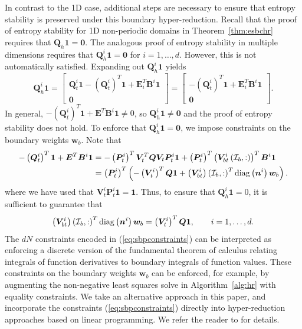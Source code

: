 \documentclass[review]{siamart171218}
\theoremstyle{assumption}
\newcommand{\LRp}[1]{\left( #1 \right)}
\newcommand{\note}[1]{{\color{blue}{#1}}}
\begin{document}
In contrast to the 1D case, additional steps are necessary to ensure that entropy stability is preserved under this boundary hyper-reduction.  Recall that the proof of entropy stability for 1D non-periodic domains in Theorem~\ref{thm:esbchr} requires that $\bm{Q}_h\bm{1} = \bm{0}$.  The analogous proof of entropy stability in multiple dimensions requires that $\bm{Q}^i_h\bm{1} = \bm{0}$ for $i = 1,\ldots, d$.  However, this is not automatically satisfied.  Expanding out $\bm{Q}^i_h\bm{1}$ yields
\[
\bm{Q}^i_h\bm{1} = \begin{bmatrix}
\bm{Q}^i_t\bm{1} - \LRp{\bm{Q}^i_t}^T\bm{1} + \bm{E}_i^T\bm{B}^i \bm{1}\\
\bm{0}
\end{bmatrix}= \begin{bmatrix}
-\LRp{\bm{Q}^i_t}^T\bm{1} + \bm{E}_i^T\bm{B}^i \bm{1}\\
\bm{0}
\end{bmatrix}.
\]
In general, $-\LRp{\bm{Q}^i_t}^T\bm{1} + \bm{E}^T\bm{B}^i \bm{1}\neq 0$, so $\bm{Q}^i_h\bm{1} \neq \bm{0}$ and the proof of entropy stability does not hold.  To enforce that $\bm{Q}^i_h\bm{1} = \bm{0}$, we impose constraints on the boundary weights $\bm{w}_b$.  Note that 
\begin{align*}
-\LRp{\bm{Q}^i_t}^T\bm{1} + \bm{E}^T\bm{B}^i \bm{1} &= -\LRp{\bm{P}^i_t}^T\bm{V}_t^T\bm{Q}\bm{V}_t\bm{P}^i_t\bm{1} + \LRp{\bm{P}^i_t}^T\LRp{\bm{V}^i_{bt}\LRp{\mathcal{I}_b,:}}^T\bm{B}^i\bm{1}\\
&= \LRp{\bm{P}^i_t}^T\LRp{-\LRp{\bm{V}^i_t}^T\bm{Q}\bm{1} + \LRp{\bm{V}^i_{bt}}\LRp{\mathcal{I}_b,:}^T{\rm diag}\LRp{\bm{n}^i}\bm{w}_b}.
\end{align*}
where we have used that $\bm{V}^i_t\bm{P}^i_t\bm{1} = \bm{1}$.  Thus, to ensure that $\bm{Q}^i_h\bm{1} = 0$, it is sufficient to guarantee that
\begin{equation}
\LRp{\bm{V}^i_{bt}}\LRp{\mathcal{I}_b,:}^T{\rm diag}\LRp{\bm{n}^i}\bm{w}_b = \LRp{\bm{V}^i_t}^T\bm{Q}\bm{1}, \qquad i = 1,\ldots, d.
\label{eq:sbpconstraints}
\end{equation}
The $dN$ constraints encoded in (\ref{eq:sbpconstraints}) can be interpreted as enforcing a discrete version of the fundamental theorem of calculus relating integrals of function derivatives to boundary integrals of function values.  These constraints on the boundary weights $\bm{w}_b$ can be enforced, for example, by augmenting the non-negative least squares solve in Algorithm~\ref{alg:hr} with equality constraints.  We take an alternative approach in this paper, and incorporate the constraints (\ref{eq:sbpconstraints}) directly into hyper-reduction approaches based on linear programming.  We refer the reader to  \cite{yano2019lp} for details.  %
\end{document}
